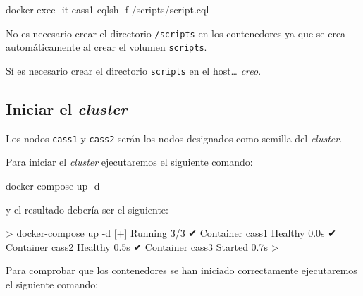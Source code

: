 \documentclass[
]{book}
\newenvironment{Shaded}{}{}
\newcommand{\AttributeTok}[1]{\textcolor[rgb]{0.49,0.56,0.16}{#1}}
\newcommand{\ExtensionTok}[1]{#1}
\newcommand{\NormalTok}[1]{#1}
\newcommand{\OperatorTok}[1]{\textcolor[rgb]{0.40,0.40,0.40}{#1}}
\begin{document}
\begin{Shaded}
\begin{Highlighting}[]
\ExtensionTok{docker}\NormalTok{ exec }\AttributeTok{{-}it}\NormalTok{ cass1 cqlsh }\AttributeTok{{-}f}\NormalTok{ /scripts/script.cql}
\end{Highlighting}
\end{Shaded}

No es necesario crear el directorio \texttt{/scripts} en los contenedores ya que se crea automáticamente al crear el volumen \texttt{scripts}.

Sí es necesario crear el directorio \texttt{scripts} en el host\ldots{} \emph{creo}.

\subsection{\texorpdfstring{Iniciar el \emph{cluster}}{Iniciar el cluster}}\label{iniciar-el-cluster}

Los nodos \texttt{cass1} y \texttt{cass2} serán los nodos designados como semilla del \emph{cluster}.

Para iniciar el \emph{cluster} ejecutaremos el siguiente comando:

\begin{Shaded}
\begin{Highlighting}[]
\ExtensionTok{docker{-}compose}\NormalTok{ up }\AttributeTok{{-}d}
\end{Highlighting}
\end{Shaded}

y el resultado debería ser el siguiente:

\begin{Shaded}
\begin{Highlighting}[]
\OperatorTok{\textgreater{}}\NormalTok{ docker{-}compose }\ExtensionTok{up} \AttributeTok{{-}d}
\ExtensionTok{[+]}\NormalTok{ Running 3/3}
 \ExtensionTok{✔}\NormalTok{ Container cass1 Healthy                                                      0.0s }
 \ExtensionTok{✔}\NormalTok{ Container cass2 Healthy                                                      0.5s }
 \ExtensionTok{✔}\NormalTok{ Container cass3 Started                                                      0.7s}
\OperatorTok{\textgreater{}}
\end{Highlighting}
\end{Shaded}

Para comprobar que los contenedores se han iniciado correctamente ejecutaremos el siguiente comando:
\end{document}
